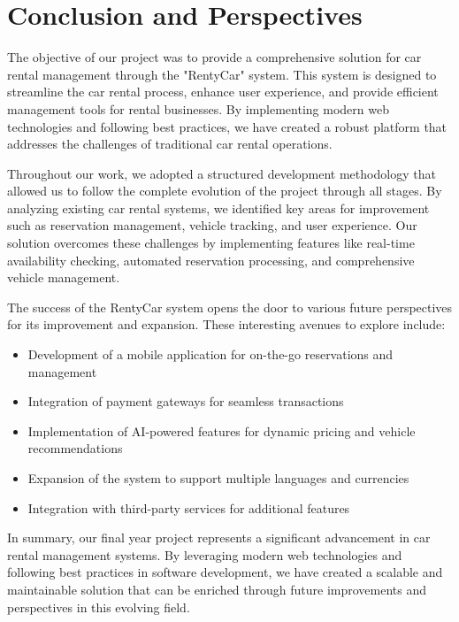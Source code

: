 \chapter*{Conclusion and Perspectives}

The objective of our project was to provide a comprehensive solution for car rental management through the "RentyCar" system. This system is designed to streamline the car rental process, enhance user experience, and provide efficient management tools for rental businesses. By implementing modern web technologies and following best practices, we have created a robust platform that addresses the challenges of traditional car rental operations.

Throughout our work, we adopted a structured development methodology that allowed us to follow the complete evolution of the project through all stages. By analyzing existing car rental systems, we identified key areas for improvement such as reservation management, vehicle tracking, and user experience. Our solution overcomes these challenges by implementing features like real-time availability checking, automated reservation processing, and comprehensive vehicle management.

The success of the RentyCar system opens the door to various future perspectives for its improvement and expansion. These interesting avenues to explore include:
\begin{itemize}
    \item Development of a mobile application for on-the-go reservations and management
    \item Integration of payment gateways for seamless transactions
    \item Implementation of AI-powered features for dynamic pricing and vehicle recommendations
    \item Expansion of the system to support multiple languages and currencies
    \item Integration with third-party services for additional features
\end{itemize}

In summary, our final year project represents a significant advancement in car rental management systems. By leveraging modern web technologies and following best practices in software development, we have created a scalable and maintainable solution that can be enriched through future improvements and perspectives in this evolving field. 